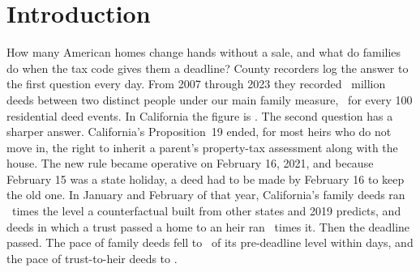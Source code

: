\section{Introduction}\label{sec:intro}

How many American homes change hands without a sale, and what do families do when the tax code gives them a deadline? County recorders log the answer to the first question every day. From 2007 through 2023 they recorded \DeedFamilyMillion\ million deeds between two distinct people under our main family measure, \DeedNationalShare\ for every 100 residential deed events. In California the figure is \DeedCAShare. The second question has a sharper answer. California's Proposition~19 ended, for most heirs who do not move in, the right to inherit a parent's property-tax assessment along with the house. The new rule became operative on February 16, 2021, and because February 15 was a state holiday, a deed had to be made by February 16 to keep the old one. In January and February of that year, California's family deeds ran \SIVMainJanFeb\ times the level a counterfactual built from other states and 2019 predicts, and deeds in which a trust passed a home to an heir ran \SIVHeirJanFeb\ times it. Then the deadline passed. The pace of family deeds fell to \SIVMainDeadlineSign\ of its pre-deadline level within days, and the pace of trust-to-heir deeds to \SIVHeirDeadlineSign.

